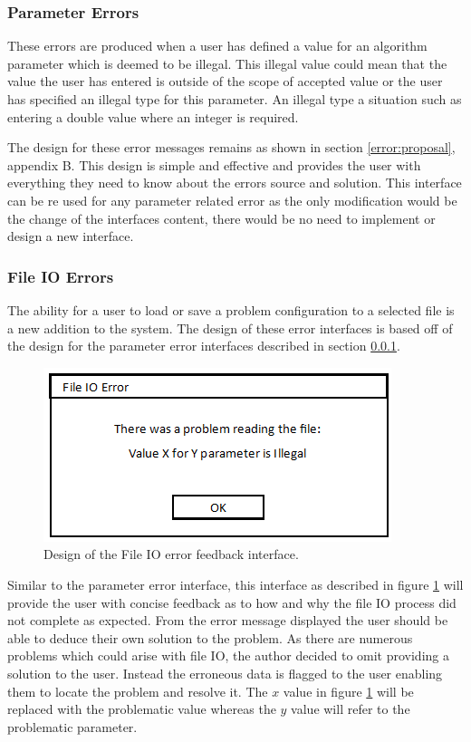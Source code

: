 \subsubsection{Parameter Errors}
\label{paramerror}
These errors are produced when a user has defined a value for an algorithm parameter which is deemed to be illegal. This illegal value could mean that the value the user has entered is outside of the scope of accepted value or the user has specified an illegal type for this parameter. An illegal type a situation such as entering a double value where an integer is required.

The design for these error messages remains as shown in section \ref{error:proposal}, appendix B. This design is simple and effective and provides the user with everything they need to know about the errors source and solution. This interface can be re used for any parameter related error as the only modification would be the change of the interfaces content, there would be no need to implement or design a new interface.

\subsubsection{File IO Errors}

The ability for a user to load or save a problem configuration to a selected file is a new addition to the system. The design of these error interfaces is based off of the design for the parameter error interfaces described in section \ref{paramerror}. 

\begin{figure}[H]
\centering
\includegraphics[scale=0.7]{Images/chapter4/IOError}
\caption[File IO Error Feedback Design]{Design of the File IO error feedback interface.}
\label{fig:ioErrors}
\end{figure}

Similar to the parameter error interface, this interface as described in figure \ref{fig:ioErrors} will provide the user with concise feedback as to how and why the file IO process did not complete as expected. From the error message displayed the user should be able to deduce their own solution to the problem. As there are numerous problems which could arise with file IO, the author decided to omit providing a solution to the user. Instead the erroneous data is flagged to the user enabling them to locate the problem and resolve it. The $x$ value in figure \ref{fig:ioErrors} will be replaced with the problematic value whereas the $y$ value will refer to the problematic parameter.

